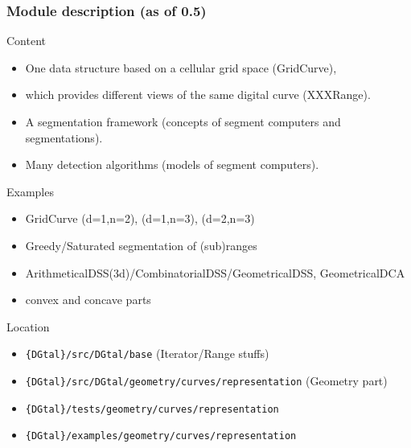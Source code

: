 \begin{frame}[squeeze]
  \frametitle{Module description (as of 0.5)}

  \begin{block}{Content}
    \begin{itemize}
      \small
    \item One data structure based on a cellular grid space (GridCurve),
    \item which provides different views of the same digital curve (XXXRange).
    \item A segmentation framework (concepts of segment computers and segmentations).
    \item Many detection algorithms (models of segment computers).
    \end{itemize}
  \end{block}

  \begin{block}{Examples}
    \begin{itemize}
      \small
    \item GridCurve (d=1,n=2), (d=1,n=3), (d=2,n=3)
    \item Greedy/Saturated segmentation of (sub)ranges
    \item ArithmeticalDSS(3d)/CombinatorialDSS/GeometricalDSS, GeometricalDCA
    \item convex and concave parts
    \end{itemize}
  \end{block}

  \begin{block}{Location}
    \begin{itemize}
    \item \texttt{\{DGtal\}/src/DGtal/base} (Iterator/Range stuffs)
    \item \texttt{\{DGtal\}/src/DGtal/geometry/curves/representation} (Geometry part) 
    \item \texttt{\{DGtal\}/tests/geometry/curves/representation}
    \item \texttt{\{DGtal\}/examples/geometry/curves/representation}
    \end{itemize}
  \end{block}

\end{frame}
